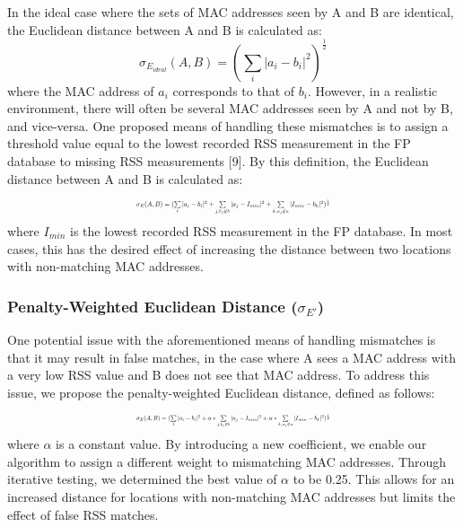\documentclass[conference]{IEEEtran}
\begin{document}
\indent In the ideal case where the sets of MAC addresses seen by A and B are identical, the Euclidean distance between A and B is calculated as:
\begin{equation}
\label{euclidean_ideal}
\sigma_{E_{ideal}}(A, B) = (\sum\limits_{i}|a_i - b_i|^2)^\frac{1}{2}
\end{equation}
\indent where the MAC address of $a_i$ corresponds to that of $b_i$. However, in a realistic environment, there will often be several MAC addresses seen by A and not by B, and vice-versa. One proposed means of handling these mismatches is to assign a threshold value equal to the lowest recorded RSS measurement in the FP database to missing RSS measurements [9]. By this definition, the Euclidean distance between A and B is calculated as:
\begin{equation}
\label{euclidean}
\resizebox{0.45\textwidth}{!}{$\sigma_{E}(A, B)=(\sum\limits_{i}|a_i-b_i|^2+\sum\limits_{j, b_j\notin b}|a_j-I_{min}|^2+\sum\limits_{k, a_j\notin a}|I_{min}-b_k|^2)^\frac{1}{2}$}
\end{equation}
\indent where $I_{min}$ is the lowest recorded RSS measurement in the FP database. In most cases, this has the desired effect of increasing the distance between two locations with non-matching MAC addresses.

\subsubsection{Penalty-Weighted Euclidean Distance ($\sigma_{E'}$)}
\indent One potential issue with the aforementioned means of handling mismatches is that it may result in false matches, in the case where A sees a MAC address with a very low RSS value and B does not see that MAC address. To address this issue, we propose the penalty-weighted Euclidean distance, defined as follows:
\begin{equation}
\label{euclidean_pw}
\resizebox{0.45\textwidth}{!}{$\sigma_{E}(A, B)=(\sum\limits_{i}|a_i-b_i|^2+\alpha*\sum\limits_{j, b_j\notin b}|a_j-I_{min}|^2+\alpha*\sum\limits_{k, a_j\notin a}|I_{min}-b_k|^2)^\frac{1}{2}$}
\end{equation}
\indent where $\alpha$ is a constant value. By introducing a new coefficient, we enable our algorithm to assign a different weight to mismatching MAC addresses.  Through iterative testing, we determined the best value of $\alpha$ to be 0.25. This allows for an increased distance for locations with non-matching MAC addresses but limits the effect of false RSS matches.
	
\end{document}
